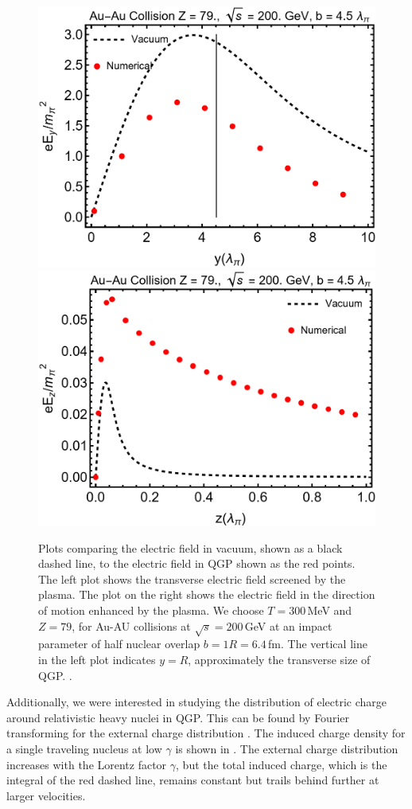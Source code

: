 \phantom{Phantom text}
\begin{figure}%
\centering
\includegraphics[width=0.75\linewidth]{plots/chap02QCD/Eyy.png}\\
\hspace{0.05\linewidth}
\includegraphics[width=0.75\linewidth]{plots/chap02QCD/Ezz.png}
\caption{Plots comparing the electric field in vacuum, shown as a black dashed line, to the electric field in QGP shown as the red points. The left plot shows the transverse electric field screened by the plasma. The plot on the right shows the electric field in the direction of motion enhanced by the plasma. We choose $T = 300$\,MeV and $Z=79$, for Au-AU collisions at $\sqrt{s} = 200$\,GeV at an impact parameter of half nuclear overlap $b = 1 R = 6.4\,$fm. The vertical line in the left plot indicates $ y = R$, approximately the transverse size of QGP. . \label{fig:efcomp}}
\end{figure}

Additionally, we were interested in studying the distribution of electric charge around relativistic heavy nuclei in QGP. This can be found by Fourier transforming  for the external charge distribution . The induced charge density for a single traveling nucleus at low $\gamma$ is shown in . The external charge distribution increases with the Lorentz factor $\gamma$, but the total induced charge, which is the integral of the red dashed line, remains constant but trails behind further at larger velocities.

